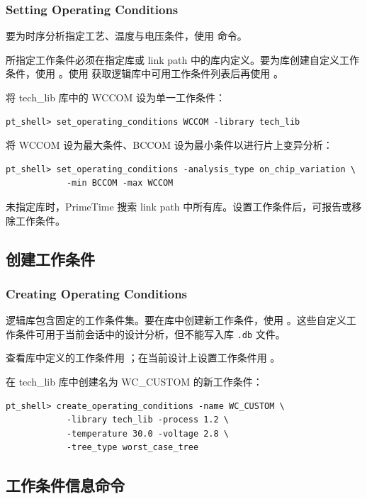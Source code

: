 \subsubsection*{Setting Operating Conditions}

要为时序分析指定工艺、温度与电压条件，使用  命令。

所指定工作条件必须在指定库或 link path 中的库内定义。要为库创建自定义工作条件，使用 。使用  获取逻辑库中可用工作条件列表后再使用 。

将 tech\_lib 库中的 WCCOM 设为单一工作条件：
\begin{lstlisting}
pt_shell> set_operating_conditions WCCOM -library tech_lib
\end{lstlisting}

将 WCCOM 设为最大条件、BCCOM 设为最小条件以进行片上变异分析：
\begin{lstlisting}
pt_shell> set_operating_conditions -analysis_type on_chip_variation \
            -min BCCOM -max WCCOM
\end{lstlisting}

未指定库时，PrimeTime 搜索 link path 中所有库。设置工作条件后，可报告或移除工作条件。

\subsection{创建工作条件}
\subsubsection*{Creating Operating Conditions}

逻辑库包含固定的工作条件集。要在库中创建新工作条件，使用 。这些自定义工作条件可用于当前会话中的设计分析，但不能写入库 \texttt{.db} 文件。

查看库中定义的工作条件用 ；在当前设计上设置工作条件用 。

在 tech\_lib 库中创建名为 WC\_CUSTOM 的新工作条件：
\begin{lstlisting}
pt_shell> create_operating_conditions -name WC_CUSTOM \
            -library tech_lib -process 1.2 \
            -temperature 30.0 -voltage 2.8 \
            -tree_type worst_case_tree
\end{lstlisting}

\subsection{工作条件信息命令}
